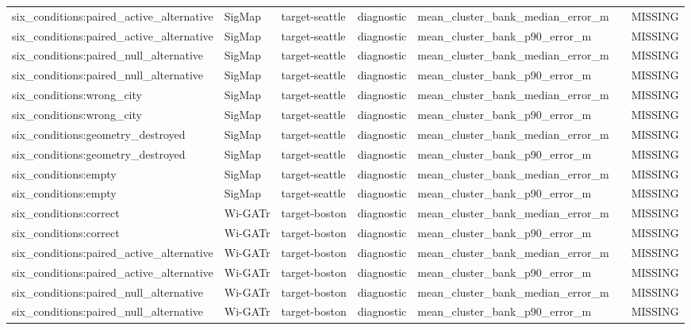\begin{longtable}{lllllll}
six\_conditions:paired\_active\_alternative & SigMap & target-seattle & diagnostic & mean\_cluster\_bank\_median\_error\_m &  & MISSING \\
six\_conditions:paired\_active\_alternative & SigMap & target-seattle & diagnostic & mean\_cluster\_bank\_p90\_error\_m &  & MISSING \\
six\_conditions:paired\_null\_alternative & SigMap & target-seattle & diagnostic & mean\_cluster\_bank\_median\_error\_m &  & MISSING \\
six\_conditions:paired\_null\_alternative & SigMap & target-seattle & diagnostic & mean\_cluster\_bank\_p90\_error\_m &  & MISSING \\
six\_conditions:wrong\_city & SigMap & target-seattle & diagnostic & mean\_cluster\_bank\_median\_error\_m &  & MISSING \\
six\_conditions:wrong\_city & SigMap & target-seattle & diagnostic & mean\_cluster\_bank\_p90\_error\_m &  & MISSING \\
six\_conditions:geometry\_destroyed & SigMap & target-seattle & diagnostic & mean\_cluster\_bank\_median\_error\_m &  & MISSING \\
six\_conditions:geometry\_destroyed & SigMap & target-seattle & diagnostic & mean\_cluster\_bank\_p90\_error\_m &  & MISSING \\
six\_conditions:empty & SigMap & target-seattle & diagnostic & mean\_cluster\_bank\_median\_error\_m &  & MISSING \\
six\_conditions:empty & SigMap & target-seattle & diagnostic & mean\_cluster\_bank\_p90\_error\_m &  & MISSING \\
six\_conditions:correct & Wi-GATr & target-boston & diagnostic & mean\_cluster\_bank\_median\_error\_m &  & MISSING \\
six\_conditions:correct & Wi-GATr & target-boston & diagnostic & mean\_cluster\_bank\_p90\_error\_m &  & MISSING \\
six\_conditions:paired\_active\_alternative & Wi-GATr & target-boston & diagnostic & mean\_cluster\_bank\_median\_error\_m &  & MISSING \\
six\_conditions:paired\_active\_alternative & Wi-GATr & target-boston & diagnostic & mean\_cluster\_bank\_p90\_error\_m &  & MISSING \\
six\_conditions:paired\_null\_alternative & Wi-GATr & target-boston & diagnostic & mean\_cluster\_bank\_median\_error\_m &  & MISSING \\
six\_conditions:paired\_null\_alternative & Wi-GATr & target-boston & diagnostic & mean\_cluster\_bank\_p90\_error\_m &  & MISSING \\

\end{longtable}
